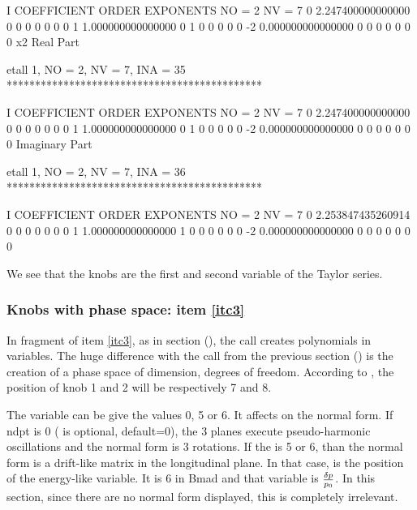 \documentclass{hitec}     %
\begin{document}
{\begin{code}
    I  COEFFICIENT          ORDER   EXPONENTS
      NO =     2      NV =     7
   0   2.247400000000000       0  0  0  0  0  0  0
   1   1.000000000000000       0  1  0  0  0  0  0
    -2   0.000000000000000       0  0  0  0  0  0  0
  x2
  Real Part

 etall    1, NO =    2, NV =    7, INA =   35
 *********************************************

    I  COEFFICIENT          ORDER   EXPONENTS
      NO =     2      NV =     7
   0   2.247400000000000       0  0  0  0  0  0  0
   1   1.000000000000000       0  1  0  0  0  0  0
    -2   0.000000000000000       0  0  0  0  0  0  0
  Imaginary Part

 etall    1, NO =    2, NV =    7, INA =   36
 *********************************************

    I  COEFFICIENT          ORDER   EXPONENTS
      NO =     2      NV =     7
   0   2.253847435260914       0  0  0  0  0  0  0
   1   1.000000000000000       1  0  0  0  0  0  0
    -2   0.000000000000000       0  0  0  0  0  0  0
\end{code}
\renewcommand{\codefont}{\small}

We see that the knobs are the first and second variable of the Taylor series.

\subsubsection{Knobs with phase space: item \ref{itc3}}
\label{s:initwithps}

In fragment of item \ref{itc3},  as in section (), the call  creates polynomials in  variables. The huge difference with the call from the previous section () is the creation of a phase space of   dimension,   degrees of freedom.  According to , the position of knob 1 and 2 will be respectively 7 and 8.

The variable  can be give the values 0, 5 or 6. It affects on the normal form. If ndpt is 0 ( is optional, default=0), the 3 planes execute pseudo-harmonic oscillations and the normal form is 3 rotations. If the  is 5 or 6, than the normal form is a drift-like matrix in the longitudinal plane. In that case,  is the position of the energy-like variable. It is 6 in Bmad and that variable is $\delta p \over p_0$. In this section, since there are no normal form displayed, this is completely irrelevant. 

}
\end{document}
